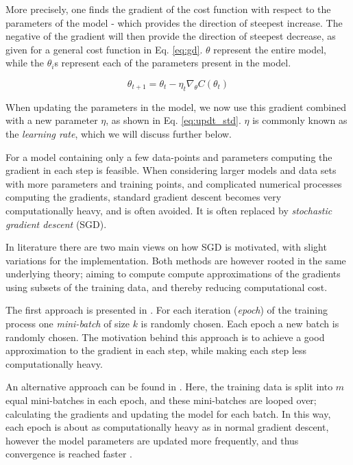 More precisely, one finds the gradient of the cost function with respect to the parameters of the model - which provides the direction of steepest increase. The negative of the gradient will then provide the direction of steepest decrease, as given for a general cost function in Eq. \ref{eq:gd}. $\theta$ represent the entire model, while the $\theta_i$s represent each of the parameters present in the model.

\begin{equation}\label{eq:updt_std}
    \theta_{t+1} = \theta_t - \eta_t \nabla_{\theta} C(\theta_t)
\end{equation}

When updating the parameters in the model, we now use this gradient combined with a new parameter $\eta$, as shown in Eq. \ref{eq:updt_std}.
$\eta$ is commonly known as the \textit{learning rate}, which we will discuss further below.

For a model containing only a few data-points and parameters computing the gradient in each step is feasible.
When considering larger models and data sets with more parameters and training points, and complicated numerical processes computing the gradients, standard gradient descent becomes very computationally heavy, and is often avoided.
It is often replaced by \textit{stochastic gradient descent} (SGD).

In literature there are two main views on how SGD is motivated, with slight variations for the implementation.
Both methods are however rooted in the same underlying theory; aiming to compute compute approximations of the gradients using subsets of the training data, and thereby reducing computational cost.

The first approach is presented in \textcite[p. 291]{Goodfellow-et-al-2016}. For each iteration (\textit{epoch}) of the training process one \textit{mini-batch} of size $k$ is randomly chosen. Each epoch a new batch is randomly chosen. 
The motivation behind this approach is to achieve a good approximation to the gradient in each step, while making each step less computationally heavy.

An alternative approach can be found in \textcite[p. 47]{raschka}.
Here, the training data is split into $m$ equal mini-batches in each epoch, and these mini-batches are looped over; calculating the gradients and updating the model for each batch.
In this way, each epoch is about as computationally heavy as in normal gradient descent, however the model parameters are updated more frequently, and thus convergence is reached faster \citep[p. 47]{raschka}.

